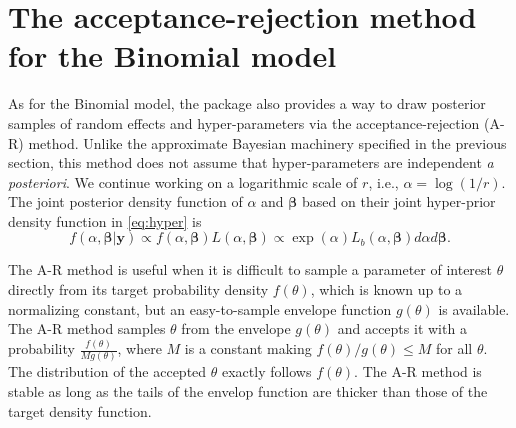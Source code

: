 \documentclass[article]{jss}
\begin{document}


\section[Estimation]{The acceptance-rejection method for the Binomial model}\label{sec_accept}
As for the Binomial model, the package  also provides a way to draw  posterior samples of random effects and hyper-parameters via the acceptance-rejection (A-R) method. Unlike the approximate Bayesian machinery specified in the previous section, this method does not assume that hyper-parameters are independent \emph{a posteriori}. We continue working on a logarithmic scale of $r$, i.e., $\alpha=\log(1/r)$. The joint posterior density function of $\alpha$ and $\boldsymbol{\beta}$ based on their joint hyper-prior density function in  \eqref{eq:hyper} is 
\begin{equation}
f(\alpha, \boldsymbol{\beta} \vert \boldsymbol{y})\propto f(\alpha, \boldsymbol{\beta})L(\alpha, \boldsymbol{\beta})\propto \exp(\alpha)L_b(\alpha, \boldsymbol{\beta})d\alpha d\boldsymbol{\beta}.
\end{equation}

The A-R method \citep{everson2000inference, tang2002fitting, robert2013monte} is useful when it is difficult to sample a parameter of interest $\theta$ directly from its target probability density $f(\theta)$, which is known up to a normalizing constant, but an easy-to-sample envelope function $g(\theta)$ is available. The A-R method samples $\theta$  from the envelope $g(\theta)$ and accepts it with a probability $\frac{f(\theta)}{Mg(\theta)}$, where $M$ is a constant making $f(\theta)/g(\theta)\le M$ for all $\theta$. The distribution of the accepted $\theta$ exactly follows $f(\theta)$. The A-R method is stable as long as the tails of the envelop function are thicker than those of the target density function. 
\end{document}
